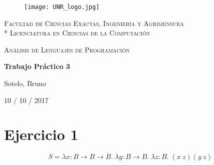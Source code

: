 \documentclass[a4paper]{article}
\begin{document}
\begin{titlepage}
\centering
\begin{figure}[H]
    \begin{center}
        \texttt{[image: UNR\_logo.jpg]}
    \end{center}
\end{figure}
{\scshape\large Facultad de Ciencias Exactas, Ingenier\'ia y Agrimensura\\*
                 Licenciatura en Ciencias de la Computaci\'on\par}
\vspace{3cm}
{\scshape\LARGE An\'alisis de Lenguajes de Programaci\'on \par}
{\huge\bfseries Trabajo Pr\'actico 3 \par}
\vspace{3cm}
{\Large Sotelo, Bruno\par}
\vfill
{\large 10 / 10 / 2017 \par}
\end{titlepage}


\section*{Ejercicio 1}
$$ S = \lambda x:B\rightarrow B\rightarrow B.\; \lambda y:B\rightarrow B.
\; \lambda z:B.\; (x\: z)(y\: z) $$
\end{document}
